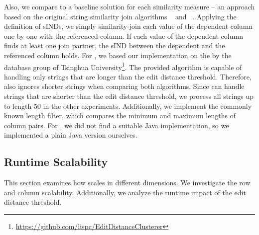 Also, we compare \sawfish to a baseline solution for each similarity measure -- an approach based on the original string similarity join algorithms ~\cite{PassJoin} and ~\cite{StringSimSurvey}.
Applying the definition of sINDs, we simply similarity-join each value of the dependent column one by one with the referenced column.
If each value of the dependent column finds at least one join partner, the sIND between the dependent and the referenced column holds.
For , we based our implementation on the  by the database group of Tsinghua University\footnote{\url{https://github.com/lispc/EditDistanceClusterer}}.
The provided algorithm is capable of handling only strings that are longer than the edit distance threshold.
Therefore, \sawfish also ignores shorter strings when comparing both algorithms.
Since \sawfish can handle strings that are shorter than the edit distance threshold, we process all strings up to length 50 in the other experiments.
Additionally, we implement the commonly known length filter, which compares the minimum and maximum lengths of column pairs.
For , we did not find a suitable Java implementation, so we implemented a plain Java version ourselves.

\subsection{Runtime Scalability}
This section examines how \sawfish scales in different dimensions.
We investigate the row and column scalability.
Additionally, we analyze the runtime impact of the edit distance threshold.

